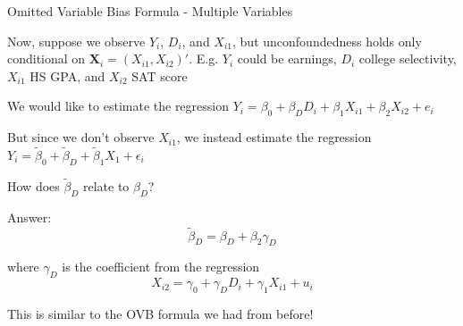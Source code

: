 \documentclass[11pt,english,handout]{beamer}
\newenvironment{wideitemize}{\itemize\addtolength{\itemsep}{10pt}}{\enditemize}
\begin{document}
\begin{frame}{Omitted Variable Bias Formula - Multiple Variables}
	\begin{wideitemize}
	
	\item
	Now, suppose we observe $Y_i$, $D_i$, and $X_{i1}$, but unconfoundedness holds only conditional on $\bm{X}_i = (X_{i1}, X_{i2})'$. \pause E.g. $Y_i$ could be earnings, $D_i$ college selectivity, $X_{i1}$ HS GPA, and $X_{i2}$ SAT score
		
	\pause	
	\item We would like to estimate the regression $Y_i = \beta_0 + \beta_{D} D_i + \beta_{1} X_{i1} + \beta_{2} X_{i2}+e_i$
	
	\pause
	\item
	But since we don't observe $X_{i1}$, we instead estimate the regression $Y_i = \tilde\beta_0 + \tilde\beta_D + \tilde\beta_1 X_1 + \epsilon_i$
	
	\pause
	\item
	How does $\tilde\beta_D$ relate to $\beta_D$? 

	\pause
	\item
	Answer: $$\tilde\beta_D= \beta_D+ \beta_2 \gamma_D$$ 
	
	\noindent where $\gamma_D$ is the coefficient from the regression $$X_{i2} = \gamma_0 + \gamma_D D_i + \gamma_1 X_{i1} + u_i$$ 

	\item This is similar to the OVB formula we had from before!
\end{wideitemize}
	
\end{frame}
\end{document}
